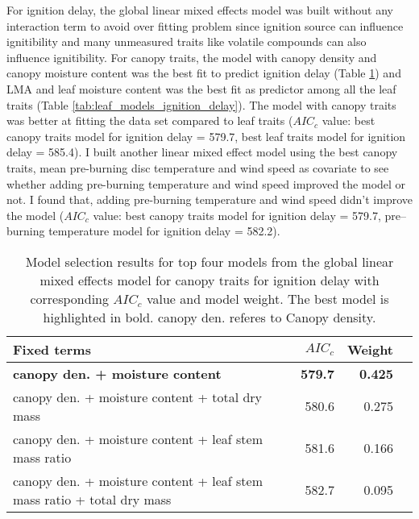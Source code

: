 \documentclass{ttuthes2007}
\begin{document}
For ignition delay, the global linear mixed effects model was built without any interaction term  to avoid over fitting problem since ignition source can influence ignitibility \citep{madrigal2012evaluation} and many unmeasured traits like volatile compounds can also influence ignitibility. For canopy traits, the model with canopy density and canopy moisture content was the best fit to predict ignition delay (Table \ref{tab:canopy_models_ignition_delay}) and LMA and leaf moisture content was the best fit as predictor among all the leaf traits (Table \ref{tab:leaf_models_ignition_delay}). The model with canopy traits was better at fitting the data set compared to leaf traits ($AIC_{c}$ value: best canopy traits model for ignition delay = 579.7, best leaf traits model for ignition delay  = 585.4). I built another linear mixed effect model using the best canopy traits,  mean pre-burning disc temperature and wind speed as  covariate to see whether adding pre-burning temperature and wind speed improved the model or not. I found that, adding pre-burning temperature and wind speed didn't improve the model ($AIC_{c}$ value: best canopy traits model for ignition delay = 579.7, pre--burning temperature model for ignition delay = 582.2).



\begin{table}
  \centering
  \caption{Model selection results for top four models from the global linear
    mixed effects model for canopy traits for ignition delay with corresponding
    $AIC_{c}$ value and model weight. The best model is highlighted in bold. canopy den. referes to Canopy density.}
  \begin{tabular}{lrrr}
    \toprule
    \textbf{Fixed terms} & $AIC_{c}$ & \textbf{Weight}\\
    \midrule
    \textbf{canopy den. + moisture content}    & \textbf{579.7} & \textbf{0.425} \\
    canopy den. + moisture content + total dry mass   & 580.6   & 0.275 \\
    canopy den. + moisture content + leaf stem mass ratio       & 581.6   & 0.166  \\
    canopy den. + moisture content + leaf stem mass ratio + total dry mass & 582.7  & 0.095 \\
    \bottomrule
  \end{tabular}
  \label{tab:canopy_models_ignition_delay}
\end{table}
\end{document}
